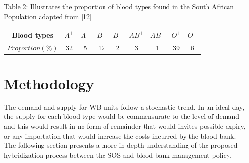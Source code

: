 \documentclass{article}
\begin{document}
\begin {center}
Table 2: {Illustrates the proportion of blood types found in the South African Population adapted from [12] }

\end {center}
\begin{center}
\begin {tabular}{|c|c|c|c|c|c|c|c|c|}
\hline

Blood types& $A^+$&$A^-$&$B^+$& $B^-$& $AB^+$& $AB^-$&  $O^+$& $O^-$ \\ [0.5ex]
\hline

 $Proportion(\%)$&32&5&12&2&3&1&39&6\\
 
\hline

\end {tabular}

\end {center}

\section{Methodology}
The demand and supply for WB units follow a stochastic trend. In an ideal day, the supply for each blood type would be commensurate to the level of demand and this would result in no form of remainder that would invites possible expiry, or any importation that would increase the costs incurred by the blood bank. The following section presents a more in-depth understanding of the proposed hybridization process between the SOS and blood bank management policy.
\end{document}
